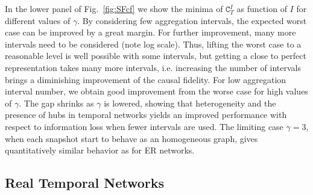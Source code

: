 \documentclass[%
 reprint,
 amsmath,amssymb,
 aps,
]{revtex4-2}
\begin{document}
In the lower panel of Fig.~\ref{fig:SFcf} we show the minima of $\mathtt{C}^I_T$ as function of $I$ for different values of $\gamma$.
By considering few aggregation intervals, the expected worst case can be improved by a great margin. For further improvement, many more intervals need to be considered (note log scale). Thus, lifting the worst case to a reasonable level is well possible with some intervals, but getting a close to perfect representation takes many more intervals, i.e. increasing the number of intervals brings a diminishing improvement of the causal fidelity.
For low aggregation interval number, we obtain good improvement from the worse case for high values of $\gamma$. The gap shrinks as $\gamma$ is lowered, showing that heterogeneity and the presence of hubs in temporal networks yields an improved performance with respect to information loss when fewer intervals are used.
The limiting case $\gamma=3$, when each snapshot start to behave as an homogeneous graph, gives quantitatively similar behavior as for ER networks. 







\subsection{\label{sec:EMPresults}Real Temporal Networks}
\end{document}
